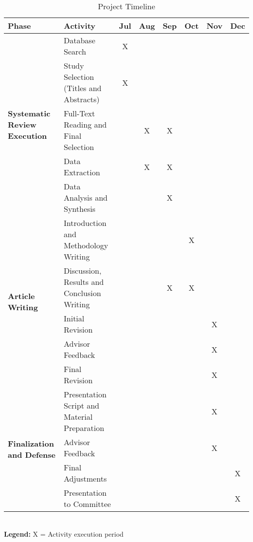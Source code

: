 \documentclass[twoside,brazilian,english]{UNISINOSmonografia}
\begin{document}
\begin{table}[htbp]
    \caption{Project Timeline}
    \label{tab:timeline}
    \centering%
    \begin{minipage}{\textwidth}
        \footnotesize
        \renewcommand{\arraystretch}{1.2}
        \begin{tabular}{|m{3.2cm}|m{4.3cm}|c|c|c|c|c|c|}
            \hline
            \textbf{Phase} & \textbf{Activity} & \textbf{Jul} & \textbf{Aug} & \textbf{Sep} & \textbf{Oct} & \textbf{Nov} & \textbf{Dec} \\
            \hline
            \multirow{5}{3.2cm}{\centering\textbf{Systematic Review Execution}} 
            & Database Search & X& & & & & \\
            \cline{2-8}
            & Study Selection (Titles and Abstracts) & X& & & & & \\
            \cline{2-8}
            & Full-Text Reading and Final Selection & & X& X& & & \\
            \cline{2-8}
            & Data Extraction & & X& X& & & \\
            \cline{2-8}
            & Data Analysis and Synthesis & & & X& & & \\
            \hline
            \multirow{5}{3.2cm}{\centering\textbf{Article Writing}} 
            & Introduction and Methodology Writing & & & & X& & \\
            \cline{2-8}
            & Discussion, Results and Conclusion Writing & & & X& X& & \\
            \cline{2-8}
            & Initial Revision & & & & & X& \\
            \cline{2-8}
            & Advisor Feedback & & & & & X& \\
            \cline{2-8}
            & Final Revision & & & & & X& \\
            \hline
            \multirow{4}{3.2cm}{\centering\textbf{Finalization and Defense}} 
            & Presentation Script and Material Preparation & & & & & X& \\
            \cline{2-8}
            & Advisor Feedback & & & & & X& \\
            \cline{2-8}
            & Final Adjustments & & & & & & X\\
            \cline{2-8}
            & Presentation to Committee & & & & & & X\\
            \hline
        \end{tabular}
        \\[0.5em]
        \textbf{Legend:} X  = Activity execution period\\
    \end{minipage}
\end{table}
\end{document}
